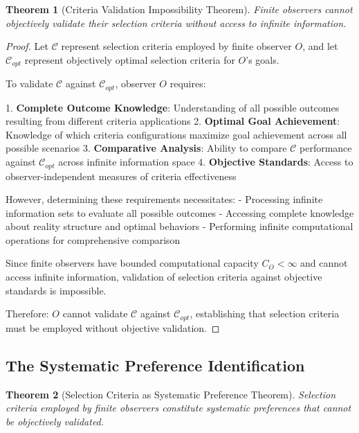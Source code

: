 \documentclass[12pt,a4paper]{article}
\newtheorem{theorem}{Theorem}[section]
\begin{document}
\begin{theorem}[Criteria Validation Impossibility Theorem]
Finite observers cannot objectively validate their selection criteria without access to infinite information.
\end{theorem}

\begin{proof}
Let $\mathcal{C}$ represent selection criteria employed by finite observer $O$, and let $\mathcal{C}_{opt}$ represent objectively optimal selection criteria for $O$'s goals.

To validate $\mathcal{C}$ against $\mathcal{C}_{opt}$, observer $O$ requires:

1. \textbf{Complete Outcome Knowledge}: Understanding of all possible outcomes resulting from different criteria applications
2. \textbf{Optimal Goal Achievement}: Knowledge of which criteria configurations maximize goal achievement across all possible scenarios  
3. \textbf{Comparative Analysis}: Ability to compare $\mathcal{C}$ performance against $\mathcal{C}_{opt}$ across infinite information space
4. \textbf{Objective Standards}: Access to observer-independent measures of criteria effectiveness

However, determining these requirements necessitates:
- Processing infinite information sets to evaluate all possible outcomes
- Accessing complete knowledge about reality structure and optimal behaviors
- Performing infinite computational operations for comprehensive comparison

Since finite observers have bounded computational capacity $C_O < \infty$ and cannot access infinite information, validation of selection criteria against objective standards is impossible.

Therefore: $O$ cannot validate $\mathcal{C}$ against $\mathcal{C}_{opt}$, establishing that selection criteria must be employed without objective validation.
\end{proof}

\subsection{The Systematic Preference Identification}

\begin{theorem}[Selection Criteria as Systematic Preference Theorem]
Selection criteria employed by finite observers constitute systematic preferences that cannot be objectively validated.
\end{theorem}
\end{document}
